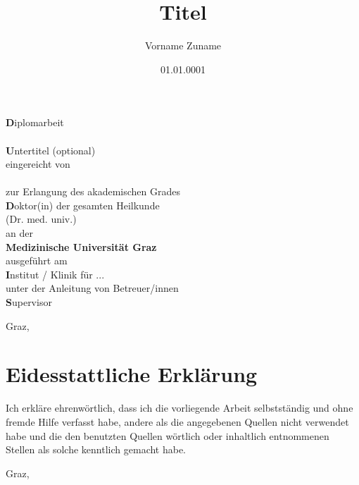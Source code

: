 \documentclass[onecolumn, 12pt, doublespace, fullpage, a4paper]{article}
\title{Titel}
\author{Vorname Zuname}
\date{01.01.0001}
\def\thesistype {Diplomarbeit}
\def\subtitle {Untertitel (optional)}
\def\place {Graz}
\def\degree {Doktor(in) der gesamten Heilkunde\\(Dr. med. univ.) }
\def\institut {Institut / Klinik für ...}
\def\supervisor {Supervisor}
\def\uni {Medizinische Universität Graz}
\begin{document}

\thispagestyle{empty}
\addvspace{5mm}  %


\begin{titlepage}
    \makeatletter
    \thispagestyle{empty}
    \doublespacing
    \begin{center}
        {\textbf\thesistype} \\
        \vspace{1cm}
        {\LARGE\textbf\textsc{\@title}} \\
        {\Large\textbf\subtitle} \\
        \vspace{2cm}
        eingereicht von\\
        {\large\textbf \@author} \\
        \vspace{2cm}
        zur Erlangung des akademischen Grades \\
        \vspace{0.2cm}
        {\large\textbf\degree} \\
        an der \\
        \vspace{2cm}
        {\large\textbf{\uni}} \\
        \vspace{0.3cm}
        ausgeführt am \\
        {\large\textbf\institut} \\
        \vspace{0.3cm}
        unter der Anleitung von Betreuer/innen \\
        {\large\textbf\supervisor{}} \\
    \end{center}
    \vfill
    \place, \@date
    \makeatother
\end{titlepage}

\section*{Eidesstattliche Erklärung}

\begin{itshape}
Ich erkläre ehrenwörtlich, dass ich die vorliegende Arbeit selbstständig und ohne
fremde Hilfe verfasst habe, andere als die angegebenen Quellen nicht verwendet
habe und die den benutzten Quellen wörtlich oder inhaltlich entnommenen Stellen
als solche kenntlich gemacht habe.

\vspace{2cm}
\makeatletter
\noindent \place, \@date \hfill \@author
\makeatother
\end{itshape}
\end{document}

